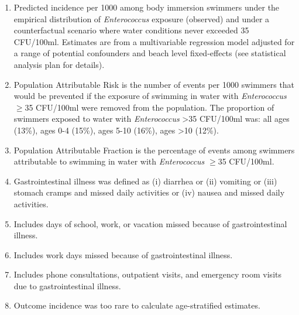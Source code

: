 \documentclass[12pt]{article}\usepackage[]{graphicx}\usepackage[]{color}
\begin{document}
\begin{table}[h!tb]
\begin{footnotesize}
\begin{center}
\begin{tabular}{l rr cc rl rl}
& \\
\hline
\end{tabular}
\end{center}
\end{footnotesize}
\begin{scriptsize}
\begin{minipage}{\textwidth}
\begin{enumerate}
  \setlength{\itemsep}{1pt}
  \item Predicted incidence per 1000 among body immersion swimmers under the empirical distribution of \textit{Enterococcus} exposure (observed) and under a counterfactual scenario where water conditions never exceeded 35 CFU/100ml. Estimates are from a multivariable regression model adjusted for a range of potential confounders and beach level fixed-effects (see statistical analysis plan for details).
  \item Population Attributable Risk is the number of events per 1000 swimmers that would be prevented if the exposure of swimming in water with \textit{Enterococcus} $\geq$35 CFU/100ml were removed from the population. The proportion of swimmers exposed to water with \textit{Enterococcus} >35 CFU/100ml was: all ages (13\%), ages 0-4 (15\%), ages 5-10 (16\%), ages >10 (12\%). 
  \item Population Attributable Fraction is the percentage of events among swimmers attributable to swimming in water with \textit{Enterococcus} $\geq$35 CFU/100ml.
  \item Gastrointestinal illness was defined as (i) diarrhea or (ii) vomiting or (iii) stomach cramps and missed daily activities or (iv) nausea and missed daily activities.
  \item Includes days of school, work, or vacation missed because of gastrointestinal illness.
  \item Includes work days missed because of gastrointestinal illness.
  \item Includes phone consultations, outpatient visits, and emergency room visits due to gastrointestinal illness. 
  \item Outcome incidence was too rare to calculate age-stratified estimates.
\end{enumerate}
\end{minipage}
\end{scriptsize}
\end{table}
\end{document}
